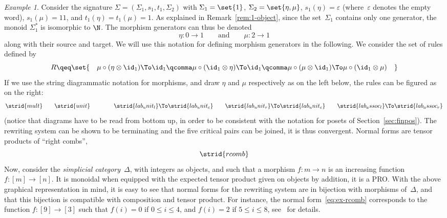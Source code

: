 \documentclass[submission,copyright,creativecommons]{eptcs}
\theoremstyle{definition}
\theoremstyle{remark}
\newtheorem{example}[theorem]{Example}
\renewcommand{\leq}{\leqslant}
\begin{document}
\begin{example}
  \label{ex:pres-moncat}
  Consider the signature $\Sigma=(\Sigma_1,s_1,t_1,\Sigma_2)$ with
  $\Sigma_1=\set{1}$, $\Sigma_2=\set{\eta,\mu}$, $s_1(\eta)=\varepsilon$
  (where~$\varepsilon$ denotes the empty word), $s_1(\mu)=11$, and
  $t_1(\eta)=t_1(\mu)=1$. As explained in Remark~\ref{rem:1-object}, since the
  set~$\Sigma_1$ contains only one generator, the monoid $\Sigma_1^*$ is
  isomorphic to $\N$. The morphism generators can thus be denoted
  \[
  \eta:0\to 1
  \qquad\text{and}\qquad
  \mu:2\to 1
  \]
  along with their source and target. We will use this notation for defining
  morphism generators in the following. We consider the set of rules defined by
  \begin{equation}
    \label{eq:monoid-rules}
    R\qeq\set{
      \quad
      \mu\circ(\eta\otimes\id_1)\To\id_1
      \qcomma
      \mu\circ(\id_1\otimes\eta)\To\id_1
      \qcomma
      \mu\circ(\mu\otimes\id_1)\To\mu\circ(\id_1\otimes\mu)
      \quad
    }
  \end{equation}
  If we use the string diagrammatic notation for morphisms, and draw $\eta$ and
  $\mu$ respectively as on the left below, the rules can be figured as on the
  right:
  \[
  \strid{mult}
  \qquad
  \strid{unit}
  \qquad\qquad
  \strid{lab_unit_l}\To\strid{lab_unit_c}
  \qquad
  \strid{lab_unit_r}\To\strid{lab_unit_c}
  \qquad
  \strid{lab_assoc_l}\To\strid{lab_assoc_r}
  \]
  (notice that diagrams have to be read from bottom up, in order to be
  consistent with the notation for posets of Section~\ref{sec:finpos}). The
  rewriting system can be shown to be terminating and the five critical pairs
  can be joined, it is thus convergent. Normal forms are tensor products of
  ``right combs'', \eg
  \begin{equation}
    \label{eq:ex-rcomb}
    \strid{rcomb}
  \end{equation}
  Now, consider the \emph{simplicial category}~$\Delta$, with integers as
  objects, and such that a morphism $f:m\to n$ is an increasing function
  $f:[m]\to[n]$. It is monoidal when equipped with the expected tensor product
  given on objects by addition, \ie it is a PRO. With the above graphical
  representation in mind, it is easy to see that normal forms for the rewriting
  system are in bijection with morphisms of~$\Delta$, and that this bijection is
  compatible with composition and tensor product. For instance, the normal
  form~\eqref{eq:ex-rcomb} corresponds to the function $f:[9]\to[3]$ such that
  $f(i)=0$ if $0\leq i\leq 4$, and $f(i)=2$ if $5\leq i\leq 8$,
  see~\cite{lafont2003towards, mimram:trt} for details.
\end{example}
\end{document}
